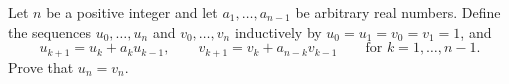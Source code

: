 Let $n$ be a positive integer and let $a_1, \ldots, a_{n-1}$ be arbitrary real numbers. Define the sequences $u_0, \ldots, u_n$ and $v_0, \ldots, v_n$ inductively by $u_0 = u_1 = v_0 = v_1 = 1$, and
\[
u_{k+1} = u_k + a_k u_{k-1}, \qquad v_{k+1} = v_k + a_{n-k} v_{k-1} \qquad \text{for } k = 1, \ldots, n-1.
\]
Prove that $u_n = v_n$.
